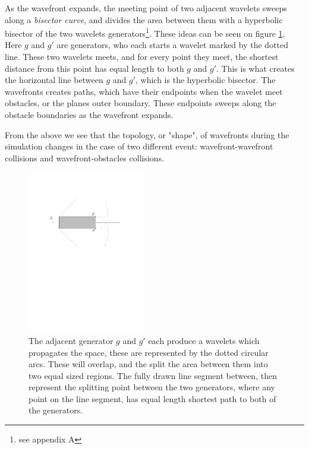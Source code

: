 As the wavefront expands, the meeting point of two adjacent wavelets sweeps along a 
\textit{bisector curve}, and divides the area between them with a hyperbolic bisector 
of the two wavelets generators\footnote{see appendix A}. These ideas can be seen on 
figure \ref{fig:bisectorex}. Here $g$ and $g'$ are generators, who each starts a 
wavelet marked by the dotted line. These two wavelets meets, and for every point they 
meet, the shortest distance from this point has equal length to both $g$ and $g'$. 
This is what creates the horizontal line between $g$ and $g'$, which is the 
hyperbolic bisector. The wavefronts creates paths, which have their endpoints when 
the wavelet meet obstacles, or the planes outer boundary. These endpoints sweeps 
along the obstacle boundaries as the wavefront expands. 

From the above we see that the topology, or "shape", of wavefronts during the 
simulation changes in the case of two different event: wavefront-wavefront collisions 
 and wavefront-obstacles collisions. 

\begin{figure}[H]
	\centering
	\includegraphics[width=0.45\textwidth]{figures/bisectorex.pdf}
	\caption{The adjacent generator $g$ and $g'$ each produce a wavelets which propagates 
    the space, these are represented by the dotted circular arcs. These will overlap, 
    and the split the area between them into two equal sized regions. The fully drawn 
    line segment between, then represent the splitting point between the two generators, 
    where any point on the line segment, has equal length shortest path to both of the 
    generators.}
	\label{fig:bisectorex}
\end{figure}

